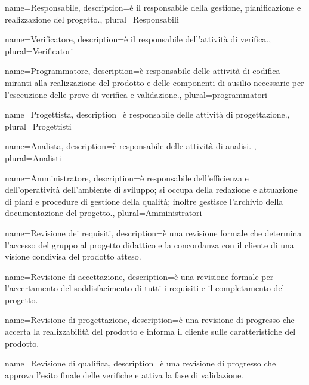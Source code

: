 \makeglossary

 {
	name=Responsabile,
	description={è il responsabile della gestione, pianificazione e realizzazione del progetto.},
	plural=Responsabili
}

 {
	name=Verificatore,
	description={è il responsabile dell'attività di verifica.},
	plural=Verificatori
}

 {
	name=Programmatore,
	description={è responsabile delle attività di codifica miranti alla realizzazione del prodotto e delle componenti di ausilio necessarie per l'esecuzione delle prove di verifica e validazione.},
	plural=programmatori
}

 {
	name=Progettista,
	description={è responsabile delle attività di progettazione.},
	plural=Progettisti
}

 {
	name=Analista,
	description={è responsabile delle attività di analisi. },
	plural=Analisti
}

 {
	name=Amministratore,
	description={è responsabile dell'efficienza e dell'operatività dell'ambiente di sviluppo; si occupa della redazione e attuazione di piani e procedure di gestione della qualità; inoltre gestisce l'archivio della documentazione del progetto.},
	plural=Amministratori
}

 {
	name=Revisione dei requisiti,
	description={è una revisione formale che determina l'accesso del gruppo al progetto didattico e la concordanza con il cliente di una visione condivisa del prodotto atteso.}
}

 {
	name=Revisione di accettazione,
	description={è una revisione formale per l'accertamento del soddisfacimento di tutti i requisiti e il completamento del progetto.}
}

 {
	name=Revisione di progettazione,
	description={è una revisione di progresso che accerta la realizzabilità del prodotto e informa il cliente sulle caratteristiche del prodotto.}
}

 {
	name=Revisione di qualifica,
	description={è una revisione di progresso che approva l'esito finale delle verifiche e attiva la fase di validazione.}
}

